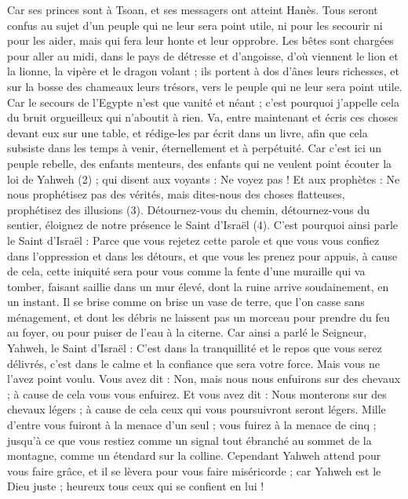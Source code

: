 \begin{multicols}{2}
Car ses princes sont à Tsoan, et ses messagers ont atteint Hanès.
Tous seront confus au sujet d’un peuple qui ne leur sera point utile, ni pour les secourir ni pour les aider, mais qui fera leur honte et leur opprobre.
Les bêtes sont chargées pour aller au midi, dans le pays de détresse et d’angoisse, d’où viennent le lion et la lionne, la vipère et le dragon volant ; ils portent à dos d’ânes leurs richesses, et sur la bosse des chameaux leurs trésors, vers le peuple qui ne leur sera point utile.
Car le secours de l’Egypte n’est que vanité et néant ; c'est pourquoi j’appelle cela du bruit orgueilleux qui n’aboutit à rien.
Va, entre maintenant et écris ces choses devant eux sur une table, et rédige-les par écrit dans un livre, afin que cela subsiste dans les temps à venir, éternellement et à perpétuité.
Car c'est ici un peuple rebelle, des enfants menteurs, des enfants qui ne veulent point écouter la loi de Yahweh (2) ;
qui disent aux voyants : Ne voyez pas ! Et aux prophètes : Ne nous prophétisez pas des vérités, mais dites-nous des choses flatteuses, prophétisez des illusions (3).
Détournez-vous du chemin, détournez-vous du sentier, éloignez de notre présence le Saint d'Israël (4).
C'est pourquoi ainsi parle le Saint d'Israël : Parce que vous rejetez cette parole et que vous vous confiez dans l'oppression et dans les détours, et que vous les prenez pour appuis,
à cause de cela, cette iniquité sera pour vous comme la fente d'une muraille qui va tomber, faisant saillie dans un mur élevé, dont la ruine arrive soudainement, en un instant.
Il se brise comme on brise un vase de terre, que l’on casse sans ménagement, et dont les débris ne laissent pas un morceau pour prendre du feu au foyer, ou pour puiser de l’eau à la citerne.
Car ainsi a parlé le Seigneur, Yahweh, le Saint d'Israël : C’est dans la tranquillité et le repos que vous serez délivrés, c’est dans le calme et la confiance que sera votre force. Mais vous ne l'avez point voulu.
Vous avez dit : Non, mais nous nous enfuirons sur des chevaux ; à cause de cela vous vous enfuirez. Et vous avez dit : Nous monterons sur des chevaux légers ; à cause de cela ceux qui vous poursuivront seront légers.
Mille d'entre vous fuiront à la menace d'un seul ; vous fuirez à la menace de cinq ; jusqu'à ce que vous restiez comme un signal tout ébranché au sommet de la montagne, comme un étendard sur la colline.
Cependant Yahweh attend pour vous faire grâce, et il se lèvera pour vous faire miséricorde ; car Yahweh est le Dieu juste ; heureux tous ceux qui se confient en lui !

\end{multicols}
